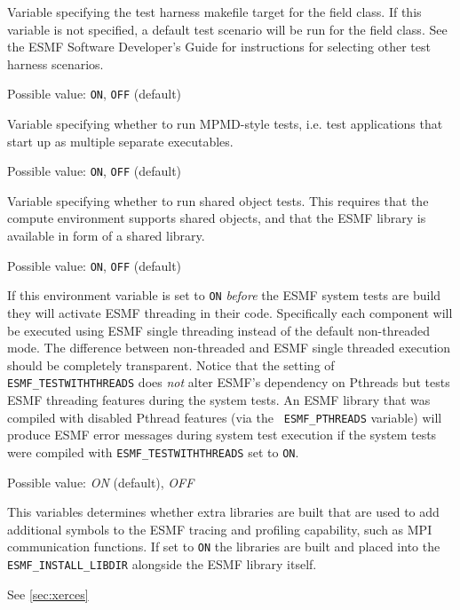 \begin{description}
Variable specifying the test harness makefile target for the field class.  If this variable is not specified, a default test scenario will be run for the field class.  See the ESMF Software Developer's Guide for instructions for selecting other test harness scenarios.

\item[ESMF\_TESTMPMD]
Possible value: {\tt ON}, {\tt OFF} (default)

Variable specifying whether to run MPMD-style tests, i.e. test applications
that start up as multiple separate executables.

\item[ESMF\_TESTSHAREDOBJ]
Possible value: {\tt ON}, {\tt OFF} (default)

Variable specifying whether to run shared object tests. This requires that the compute environment supports shared objects, and that the ESMF library is available in form of a shared library.

\item[ESMF\_TESTWITHTHREADS]
Possible value: {\tt ON}, {\tt OFF} (default)

If this environment variable is set to {\tt ON} {\em before} the ESMF system
tests are build they will activate ESMF threading in their code. Specifically
each component will be executed using ESMF single threading instead of the
default non-threaded mode. The difference between non-threaded and ESMF
single threaded execution should be completely transparent. Notice that the
setting of {\tt ESMF\_TESTWITHTHREADS} does {\em not} alter ESMF's dependency
on Pthreads but tests ESMF threading features during the system tests. An
ESMF library that was compiled with disabled Pthread features (via the {\tt
ESMF\_PTHREADS} variable) will produce ESMF error messages during system test
execution if the system tests were compiled with {\tt ESMF\_TESTWITHTHREADS}
set to {\tt ON}.

\item[ESMF\_TRACE\_LIB\_BUILD]
Possible value: {\em ON} (default), {\em OFF}

This variables determines whether extra libraries are built that are used
to add additional symbols to the ESMF tracing and profiling capability,
such as MPI communication functions.
If set to {\tt ON} the libraries are built and placed into the
{\tt ESMF\_INSTALL\_LIBDIR} alongside the ESMF library itself.

\item[ESMF\_XERCES]
See \ref{sec:xerces}


\end{description}
